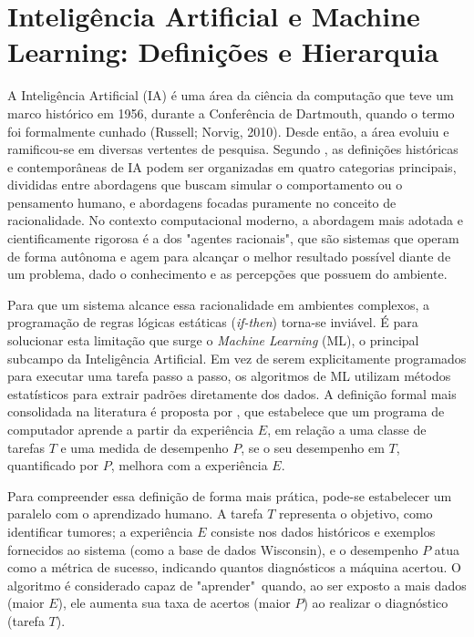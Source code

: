 \documentclass[
    12pt
    ,oneside
    ,a4paper
    ,chapter=TITLE
    ,section=TITLE
    ,sumario=abnt-6027-2012
    ,english,brazil]{abntex2} %
\begin{document}
\section{Inteligência Artificial e Machine Learning: Definições e Hierarquia}

A Inteligência Artificial (IA) é uma área da ciência da computação que teve um marco histórico em 1956, durante a Conferência de Dartmouth, quando o termo foi formalmente cunhado (Russell; Norvig, 2010). Desde então, a área evoluiu e ramificou-se em diversas vertentes de pesquisa. Segundo , as definições históricas e contemporâneas de IA podem ser organizadas em quatro categorias principais, divididas entre abordagens que buscam simular o comportamento ou o pensamento humano, e abordagens focadas puramente no conceito de racionalidade. No contexto computacional moderno, a abordagem mais adotada e cientificamente rigorosa é a dos "agentes racionais", que são sistemas que operam de forma autônoma e agem para alcançar o melhor resultado possível diante de um problema, dado o conhecimento e as percepções que possuem do ambiente.

Para que um sistema alcance essa racionalidade em ambientes complexos, a programação de regras lógicas estáticas (\textit{if-then}) torna-se inviável. É para solucionar esta limitação que surge o \textit{Machine Learning} (ML), o principal subcampo da Inteligência Artificial. Em vez de serem explicitamente programados para executar uma tarefa passo a passo, os algoritmos de ML utilizam métodos estatísticos para extrair padrões diretamente dos dados. A definição formal mais consolidada na literatura é proposta por , que estabelece que um programa de computador aprende a partir da experiência $E$, em relação a uma classe de tarefas $T$ e uma medida de desempenho $P$, se o seu desempenho em $T$, quantificado por $P$, melhora com a experiência $E$.

Para compreender essa definição de forma mais prática, pode-se estabelecer um paralelo com o aprendizado humano. A tarefa $T$ representa o objetivo, como identificar tumores; a experiência $E$ consiste nos dados históricos e exemplos fornecidos ao sistema (como a base de dados Wisconsin), e o desempenho $P$ atua como a métrica de sucesso, indicando quantos diagnósticos a máquina acertou. O algoritmo é considerado capaz de "aprender"\ quando, ao ser exposto a mais dados (maior $E$), ele aumenta sua taxa de acertos (maior $P$) ao realizar o diagnóstico (tarefa $T$).
\end{document}
